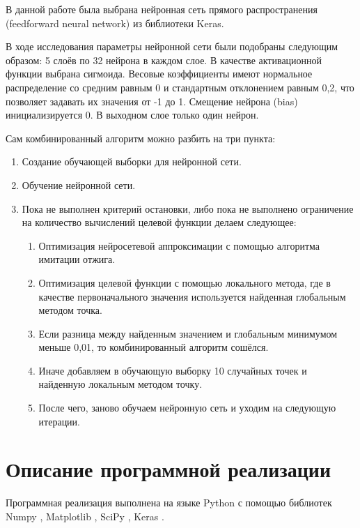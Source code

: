 \documentclass[11pt, oneside, a4paper]{article}
\begin{document}
В данной работе была выбрана нейронная сеть прямого распространения (feedforward neural network)\cite{fio_bib2,fio_bib3,fio_bib4,fio_bib5,fio_bib6,fio_bib7} из библиотеки Keras\cite{fio_bib15}. 

В ходе исследования параметры нейронной сети были подобраны следующим образом: 5 слоёв по 32 нейрона в каждом слое. В качестве активационной функции выбрана сигмоида. Весовые коэффициенты имеют нормальное распределение со средним равным 0 и стандартным отклонением равным 0,2, что позволяет задавать их значения от -1 до 1. Смещение нейрона (bias) инициализируется 0. В выходном слое только один нейрон. 

Сам комбинированный алгоритм можно разбить на три пункта:
\begin{enumerate}
\item Создание обучающей выборки для нейронной сети.
\item Обучение нейронной сети.
\item Пока не выполнен критерий остановки, либо пока не выполнено ограничение на количество вычислений целевой функции делаем следующее:
\begin{enumerate}
\item Оптимизация нейросетевой аппроксимации с помощью алгоритма имитации отжига.
\item Оптимизация целевой функции с помощью локального метода, где в качестве первоначального значения используется найденная глобальным методом точка.
\item Если разница между найденным значением и глобальным минимумом меньше 0,01, то комбинированный алгоритм сошёлся.
\item Иначе добавляем в обучающую выборку 10 случайных точек и найденную локальным методом точку.
\item После чего, заново обучаем нейронную сеть и уходим на следующую итерации.
\end{enumerate}
\end{enumerate}
\section{Описание программной реализации}
Программная реализация выполнена на языке Python с помощью библиотек Numpy \cite{fio_bib12}, Matplotlib \cite{fio_bib13}, SciPy \cite{fio_bib14}, Keras \cite{fio_bib15}. 	
\end{document}
